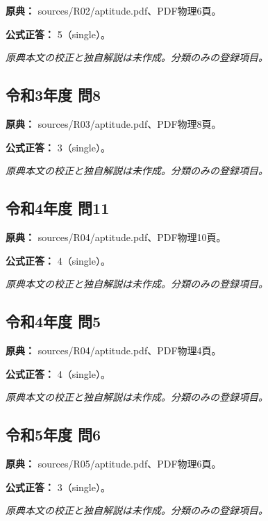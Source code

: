 \noindent\textbf{原典：} sources/R02/aptitude.pdf、PDF物理6頁。

\textbf{公式正答：} 5（single）。

\par\textit{原典本文の校正と独自解説は未作成。分類のみの登録項目。}

\subsection{令和3年度 問8}
\label{q:r03-reg-apt-08}

\noindent\textbf{原典：} sources/R03/aptitude.pdf、PDF物理8頁。

\textbf{公式正答：} 3（single）。

\par\textit{原典本文の校正と独自解説は未作成。分類のみの登録項目。}

\subsection{令和4年度 問11}
\label{q:r04-reg-apt-11}

\noindent\textbf{原典：} sources/R04/aptitude.pdf、PDF物理10頁。

\textbf{公式正答：} 4（single）。

\par\textit{原典本文の校正と独自解説は未作成。分類のみの登録項目。}

\subsection{令和4年度 問5}
\label{q:r04-reg-apt-05}

\noindent\textbf{原典：} sources/R04/aptitude.pdf、PDF物理4頁。

\textbf{公式正答：} 4（single）。

\par\textit{原典本文の校正と独自解説は未作成。分類のみの登録項目。}

\subsection{令和5年度 問6}
\label{q:r05-reg-apt-06}

\noindent\textbf{原典：} sources/R05/aptitude.pdf、PDF物理6頁。

\textbf{公式正答：} 3（single）。

\par\textit{原典本文の校正と独自解説は未作成。分類のみの登録項目。}

